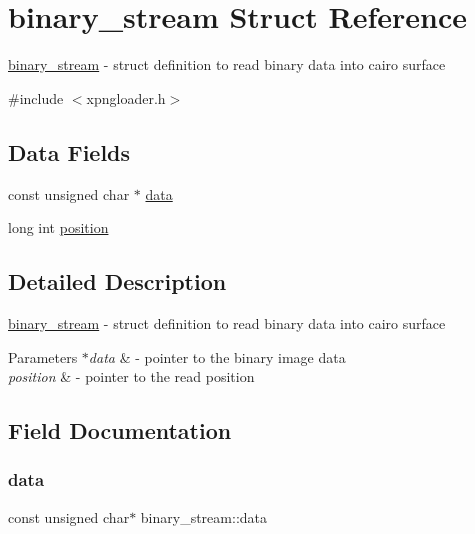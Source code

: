 \hypertarget{structbinary__stream}{}\section{binary\+\_\+stream Struct Reference}
\label{structbinary__stream}


\hyperlink{structbinary__stream}{binary\+\_\+stream} -\/ struct definition to read binary data into cairo surface  




{\ttfamily \#include $<$xpngloader.\+h$>$}

\subsection*{Data Fields}
\begin{DoxyCompactItemize}
\item 
const unsigned char $\ast$ \hyperlink{structbinary__stream_ab0be3088382416d88b7b3c5794a189ee}{data}
\item 
long int \hyperlink{structbinary__stream_ac81f4ba9f676c1bb011642915884ee57}{position}
\end{DoxyCompactItemize}


\subsection{Detailed Description}
\hyperlink{structbinary__stream}{binary\+\_\+stream} -\/ struct definition to read binary data into cairo surface 


\begin{DoxyParams}{Parameters}
{\em $\ast$data} & -\/ pointer to the binary image data \\
\hline
{\em position} & -\/ pointer to the read position \\
\hline
\end{DoxyParams}


\subsection{Field Documentation}
\mbox{\label{structbinary__stream_ab0be3088382416d88b7b3c5794a189ee}} 
\subsubsection{\texorpdfstring{data}{data}}
{\footnotesize\ttfamily const unsigned char$\ast$ binary\+\_\+stream\+::data}

